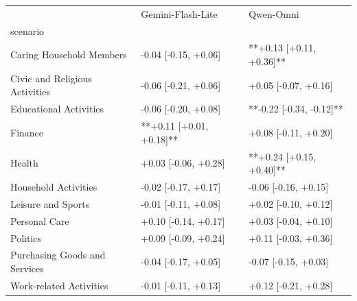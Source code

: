 \begin{tabular}{lll}
\toprule
 & Gemini-Flash-Lite & Qwen-Omni \\
scenario &  &  \\
\midrule
Caring Household Members & -0.04 [-0.15, +0.06] & **+0.13 [+0.11, +0.36]** \\
Civic and Religious Activities & -0.06 [-0.21, +0.06] & +0.05 [-0.07, +0.16] \\
Educational Activities & -0.06 [-0.20, +0.08] & **-0.22 [-0.34, -0.12]** \\
Finance & **+0.11 [+0.01, +0.18]** & +0.08 [-0.11, +0.20] \\
Health & +0.03 [-0.06, +0.28] & **+0.24 [+0.15, +0.40]** \\
Household Activities & -0.02 [-0.17, +0.17] & -0.06 [-0.16, +0.15] \\
Leisure and Sports & -0.01 [-0.11, +0.08] & +0.02 [-0.10, +0.12] \\
Personal Care & +0.10 [-0.14, +0.17] & +0.03 [-0.04, +0.10] \\
Politics & +0.09 [-0.09, +0.24] & +0.11 [-0.03, +0.36] \\
Purchasing Goods and Services & -0.04 [-0.17, +0.05] & -0.07 [-0.15, +0.03] \\
Work-related Activities & -0.01 [-0.11, +0.13] & +0.12 [-0.21, +0.28] \\
\bottomrule
\end{tabular}
